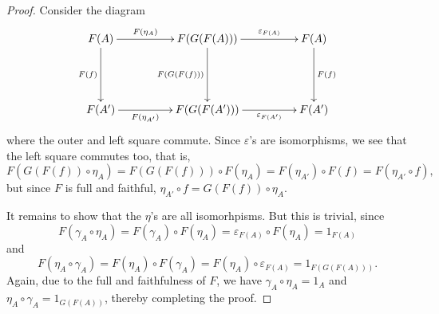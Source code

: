 \begin{proof}
    Consider the diagram 
    \begin{equation*}
        \xymatrix@+2pc {
            F(A)\ar[d]_{F(f)}\ar[r]^-{F(\eta_A)} & F(G(F(A)))\ar[d]_{F(G(F(f)))}\ar[r]^-{\varepsilon_{F(A)}} & F(A)\ar[d]^{F(f)}\\
            F(A')\ar[r]_-{F(\eta_{A'})} & F(G(F(A')))\ar[r]_-{\varepsilon_{F(A')}} & F(A')
        }
    \end{equation*}
    where the outer and left square commute. Since $\varepsilon$'s are isomorphisms, we see that the left square commutes too, that is, 
    \begin{equation*}
        F\left(G(F(f))\circ\eta_A\right) = F(G(F(f)))\circ F(\eta_A) = F(\eta_{A'})\circ F(f) = F(\eta_{A'}\circ f),
    \end{equation*}
    but since $F$ is full and faithful, $\eta_{A'}\circ f = G(F(f))\circ\eta_A$. 

    It remains to show that the $\eta$'s are all isomorhpisms. But this is trivial, since 
    \begin{equation*}
        F(\gamma_A\circ\eta_A) = F(\gamma_A)\circ F(\eta_A) = \varepsilon_{F(A)}\circ F(\eta_A) = 1_{F(A)}
    \end{equation*}
    and 
    \begin{equation*}
        F(\eta_A\circ\gamma_A) = F(\eta_A)\circ F(\gamma_A) = F(\eta_A)\circ\varepsilon_{F(A)} = 1_{F(G(F(A)))}.
    \end{equation*}
    Again, due to the full and faithfulness of $F$, we have $\gamma_A\circ\eta_A = 1_A$ and $\eta_A\circ\gamma_A = 1_{G(F(A))}$, thereby completing the proof.
\end{proof}